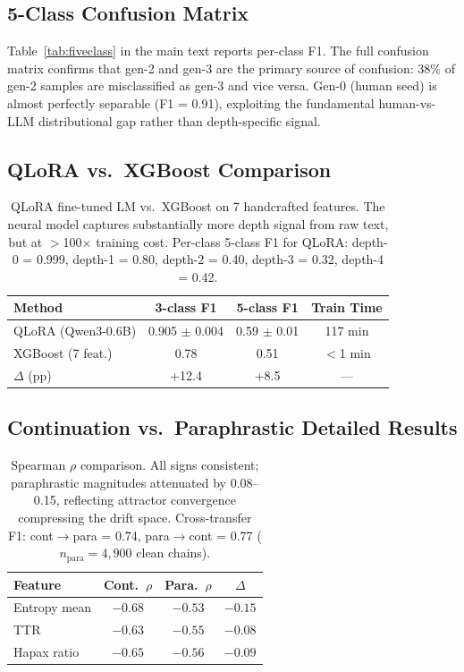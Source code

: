 \documentclass[11pt,a4paper]{article}
\begin{document}
\subsection{5-Class Confusion Matrix}
Table~\ref{tab:fiveclass} in the main text reports per-class F1. The full confusion matrix confirms that gen-2 and gen-3 are the primary source of confusion: 38\% of gen-2 samples are misclassified as gen-3 and vice versa. Gen-0 (human seed) is almost perfectly separable (F1 = 0.91), exploiting the fundamental human-vs-LLM distributional gap rather than depth-specific signal.

\subsection{QLoRA vs.\ XGBoost Comparison}

\begin{table}[h]
\centering
\small
\begin{tabular}{lccc}
\toprule
\textbf{Method} & \textbf{3-class F1} & \textbf{5-class F1} & \textbf{Train Time} \\
\midrule
QLoRA (Qwen3-0.6B) & 0.905 $\pm$ 0.004 & 0.59 $\pm$ 0.01 & 117 min \\
XGBoost (7 feat.)   & 0.78              & 0.51              & $<$1 min \\
\midrule
$\Delta$ (pp)       & +12.4             & +8.5              & --- \\
\bottomrule
\end{tabular}
\caption{QLoRA fine-tuned LM vs.\ XGBoost on 7 handcrafted features. The neural model captures substantially more depth signal from raw text, but at $>$100$\times$ training cost. Per-class 5-class F1 for QLoRA: depth-0 = 0.999, depth-1 = 0.80, depth-2 = 0.40, depth-3 = 0.32, depth-4 = 0.42.}
\label{tab:qlora}
\end{table}

\subsection{Continuation vs.\ Paraphrastic Detailed Results}

\begin{table}[h]
\centering
\small
\begin{tabular}{lccc}
\toprule
\textbf{Feature} & \textbf{Cont.\ $\rho$} & \textbf{Para.\ $\rho$} & \textbf{$\Delta$} \\
\midrule
Entropy mean & $-0.68$ & $-0.53$ & $-0.15$ \\
TTR          & $-0.63$ & $-0.55$ & $-0.08$ \\
Hapax ratio  & $-0.65$ & $-0.56$ & $-0.09$ \\
\bottomrule
\end{tabular}
\caption{Spearman $\rho$ comparison. All signs consistent; paraphrastic magnitudes attenuated by 0.08--0.15, reflecting attractor convergence compressing the drift space. Cross-transfer F1: cont$\to$para = 0.74, para$\to$cont = 0.77 ($n_{\text{para}} = 4{,}900$ clean chains).}
\label{tab:para_detail}
\end{table}
\end{document}
